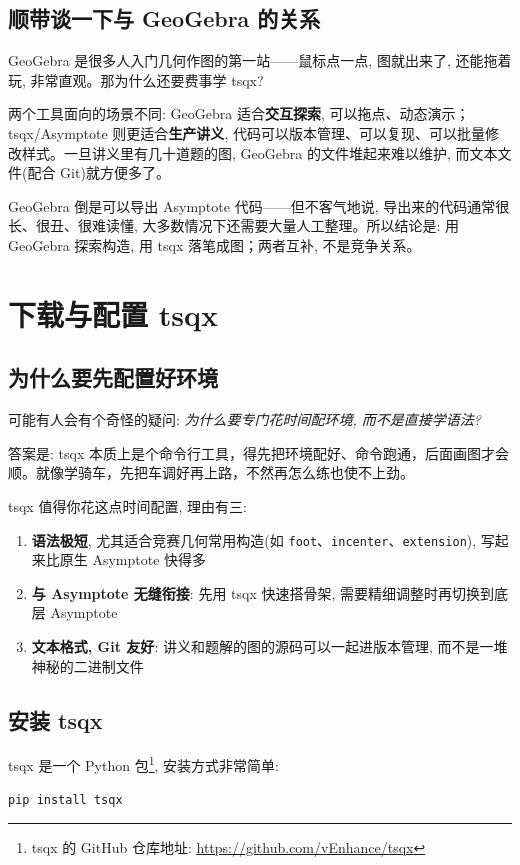 \documentclass[11pt,oneside]{ctexbook}
\begin{document}
\section{顺带谈一下与 GeoGebra 的关系}
GeoGebra 是很多人入门几何作图的第一站——鼠标点一点, 图就出来了, 还能拖着玩, 非常直观。那为什么还要费事学 tsqx?

两个工具面向的场景不同: GeoGebra 适合\textbf{交互探索}, 可以拖点、动态演示；tsqx/Asymptote 则更适合\textbf{生产讲义}, 代码可以版本管理、可以复现、可以批量修改样式。一旦讲义里有几十道题的图, GeoGebra 的文件堆起来难以维护, 而文本文件(配合 Git)就方便多了。

GeoGebra 倒是可以导出 Asymptote 代码——但不客气地说, 导出来的代码通常很长、很丑、很难读懂, 大多数情况下还需要大量人工整理。所以结论是: 用 GeoGebra 探索构造, 用 tsqx 落笔成图；两者互补, 不是竞争关系。

\chapter{下载与配置 tsqx}
\section{为什么要先配置好环境}
可能有人会有个奇怪的疑问: \textit{为什么要专门花时间配环境, 而不是直接学语法?}

答案是: tsqx 本质上是个命令行工具，得先把环境配好、命令跑通，后面画图才会顺。就像学骑车，先把车调好再上路，不然再怎么练也使不上劲。

tsqx 值得你花这点时间配置, 理由有三:
\begin{enumerate}
	\item \textbf{语法极短}, 尤其适合竞赛几何常用构造(如 \texttt{foot}、\texttt{incenter}、\texttt{extension}), 写起来比原生 Asymptote 快得多
	\item \textbf{与 Asymptote 无缝衔接}: 先用 tsqx 快速搭骨架, 需要精细调整时再切换到底层 Asymptote
	\item \textbf{文本格式, Git 友好}: 讲义和题解的图的源码可以一起进版本管理, 而不是一堆神秘的二进制文件
\end{enumerate}

\section{安装 tsqx}
tsqx 是一个 Python 包\footnote{tsqx 的 GitHub 仓库地址: \url{https://github.com/vEnhance/tsqx}}, 安装方式非常简单:
\begin{lstlisting}[language=bash]
pip install tsqx
\end{lstlisting}
\end{document}
